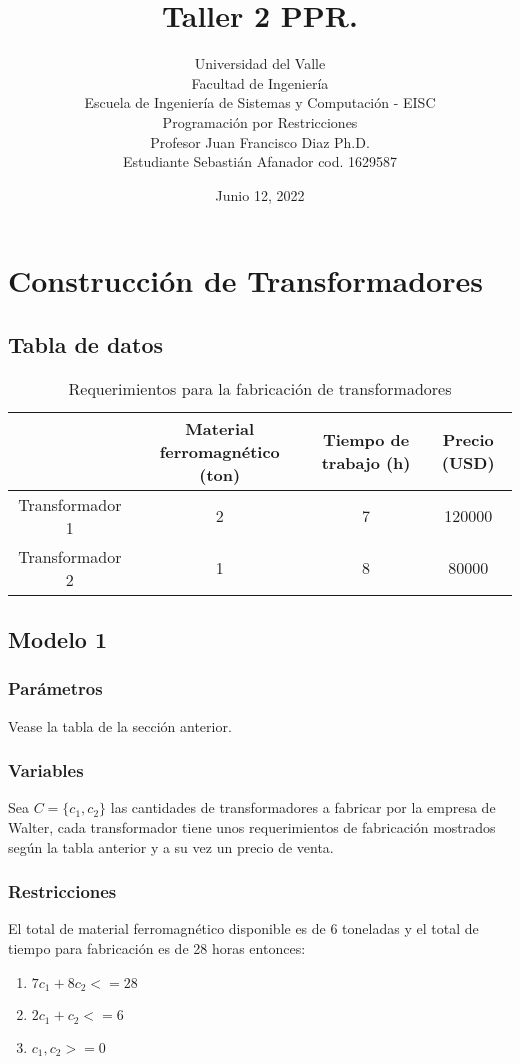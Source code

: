 \documentclass{article}
\title{
    Taller 2 PPR.\\
}
\author{
    Universidad del Valle\\
    Facultad de Ingeniería\\
    Escuela de Ingeniería de Sistemas y Computación - EISC\\
    Programación por Restricciones\\
    Profesor Juan Francisco Diaz Ph.D.\\
    Estudiante Sebastián Afanador cod. 1629587
}
\date{Junio 12, 2022}
\begin{document}
\maketitle
\section{Construcción de Transformadores}
\subsection{Tabla de datos}
\begin{table}
    \begin{center}
        \begin{tabular}{ |c|c|c|c| } 
            \hline
            & Material ferromagnético (ton) & 
            Tiempo de trabajo (h) & 
            Precio (USD) \\ 
            \hline\hline
            Transformador 1 & 2 & 7 & 120000 \\ 
            Transformador 2 & 1 & 8 & 80000 \\ 
            \hline
        \end{tabular}
        \caption{Requerimientos para la fabricación de transformadores}
        \label{tab:caption}
    \end{center}
\end{table}

\subsection{Modelo 1}
\subsubsection{Parámetros}
Vease la tabla de la sección anterior.
\subsubsection{Variables}
Sea $C=\{c_1,c_2\}$ las cantidades de transformadores a fabricar por la empresa de Walter, cada transformador tiene unos requerimientos de fabricación mostrados según la tabla anterior y a su vez un precio de venta.
\subsubsection{Restricciones}
El total de material ferromagnético disponible es de 6 toneladas y el total de tiempo para fabricación es de 28 horas entonces:\\
\begin{enumerate}
    \item $7c_1 + 8c_2 <= 28$
    \item $2c_1 + c_2 <= 6$
    \item $c_1, c_2 >= 0$
\end{enumerate}
\end{document}
